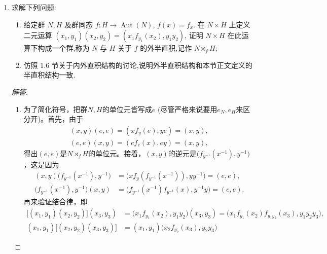 \begin{enumerate}
证明: $G = \operatorname{Ker} \alpha \rtimes \operatorname{Im} \beta$.
\begin{proof}
    $\operatorname{Ker}\alpha$是$G$的正规子群是显然的，
    $\operatorname{Ker}\alpha\cap\operatorname{Im}\beta=\{e_G\}$也是容易的，
    因为如果$\beta(h)$满足$\alpha(\beta(h))=e_H$，那么$h=e_H$，从而$\beta(h)=e_G$。
    由于$\alpha(g)=\alpha(\beta(\alpha(g)))$，
    得到$g\,\big(\beta(\alpha(g))\big)^{-1}\in\operatorname{Ker}\alpha$，
    从而通过$G$中的元素$g$能写成$g\,\big(\beta(\alpha(g))\big)^{-1}$
    和$\beta(\alpha(g))$的乘积得出$G=\operatorname{Ker}\alpha\,\operatorname{Im}\beta$。
\end{proof}
\item 求解下列问题:
\begin{enumerate}[label=(\arabic*)]
\item 给定群 $N,H$ 及群同态 $f: H \rightarrow \operatorname{Aut}(N)$, $f(x) = f_x$.
在 $N \times H$ 上定义二元运算 $(x_1 , y_1)(x_2 , y_2) = (x_1 f_{y_1}(x_2), y_1 y_2)$,
证明 $N \times H$ 在此运算下构成一个群,称为 $N$ 与 $H$ 关于 $f$ 的外半直积,记作 $N \rtimes_{f} H$;
\item 仿照 1.6 节关于内外直积结构的讨论,说明外半直积结构和本节正文定义的半直积结构一致.
\end{enumerate}
\begin{proof}[解答]
    \begin{enumerate}[label=(\arabic*)]
    \item 为了简化符号，把群$N,H$的单位元皆写成$e$ (尽管严格来说要用$e_N,e_H$来区分开)。首先，由于
    \begin{align*}
        (x,y)(e,e)=(xf_y(e),ye)=(x,y),\\
        (e,e)(x,y)=(ef_e(x),ey)=(x,y),
    \end{align*}
    得出$(e,e)$是$N\rtimes_fH$的单位元。接着，$(x,y)$的逆元是$\big(f_{y^{-1}}(x^{-1}),y^{-1}\big)$，这是因为\begin{align*}
        (x,y)\big(f_{y^{-1}}(x^{-1}),y^{-1}\big)&=\big(xf_y(f_{y^{-1}}(x^{-1})),yy^{-1}\big)=(e,e),\\
        \big(f_{y^{-1}}(x^{-1}),y^{-1}\big)(x,y)&=\big(f_{y^{-1}}(x^{-1})f_{y^{-1}}(x),y^{-1}y\big)=(e,e).
    \end{align*}
    再来验证结合律，即
    \begin{align*}
        \big[(x_1,y_1)(x_2,y_2)\big](x_3,y_3)&=\big(x_1f_{y_1}(x_2),y_1y_2\big)(x_3,y_3)
        =\big(x_1f_{y_1}(x_2)f_{y_1y_2}(x_3),y_1y_2y_3\big),\\
        (x_1,y_1)\big[(x_2,y_2)(x_3,y_3)\big]&=(x_1,y_1)\big(x_2f_{y_2}(x_3),y_2y_3\big)

\end{align*}
\end{enumerate}
\end{proof}
\end{enumerate}
